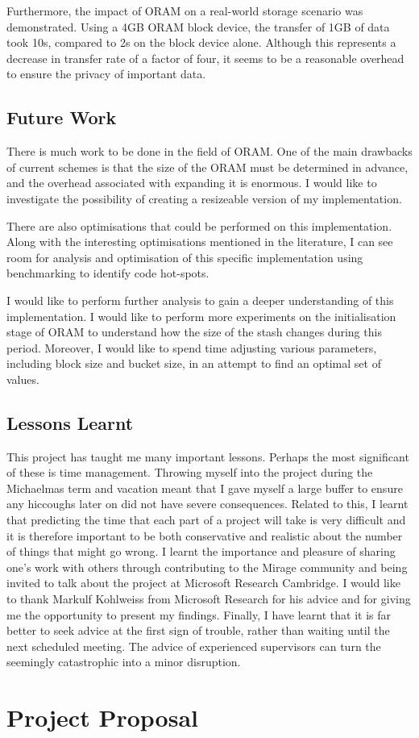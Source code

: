 \documentclass[12pt,a4paper,twoside,openright]{report}
\begin{document}
Furthermore, the impact of ORAM on a real-world storage scenario was demonstrated. Using a 4GB ORAM block device, the transfer of 1GB of data took 10s, compared to 2s on the block device alone. Although this represents a decrease in transfer rate of a factor of four, it seems to be a reasonable overhead to ensure the privacy of important data.


\section{Future Work}

There is much work to be done in the field of ORAM. One of the main drawbacks of current schemes is that the size of the ORAM must be determined in advance, and the overhead associated with expanding it is enormous. I would like to investigate the possibility of creating a resizeable version of my implementation.

There are also optimisations that could be performed on this implementation. Along with the interesting optimisations mentioned in the literature, I can see room for analysis and optimisation of this specific implementation using benchmarking to identify code hot-spots.

I would like to perform further analysis to gain a deeper understanding of this implementation. I would like to perform more experiments on the initialisation stage of ORAM to understand how the size of the stash changes during this period. Moreover, I would like to spend time adjusting various parameters, including block size and bucket size, in an attempt to find an optimal set of values.

\section{Lessons Learnt}

This project has taught me many important lessons. Perhaps the most significant of these is time management. Throwing myself into the project during the Michaelmas term and vacation meant that I gave myself a large buffer to ensure any hiccoughs later on did not have severe consequences. Related to this, I learnt that predicting the time that each part of a project will take is very difficult and it is therefore important to be both conservative and realistic about the number of things that might go wrong. I learnt the importance and pleasure of sharing one's work with others through contributing to the Mirage community and being invited to talk about the project at Microsoft Research Cambridge. I would like to thank Markulf Kohlweiss from Microsoft Research for his advice and for giving me the opportunity to present my findings. Finally, I have learnt that it is far better to seek advice at the first sign of trouble, rather than waiting until the next scheduled meeting. The advice of experienced supervisors can turn the seemingly catastrophic into a minor disruption.



\appendix

\chapter{Project Proposal}


\end{document}
